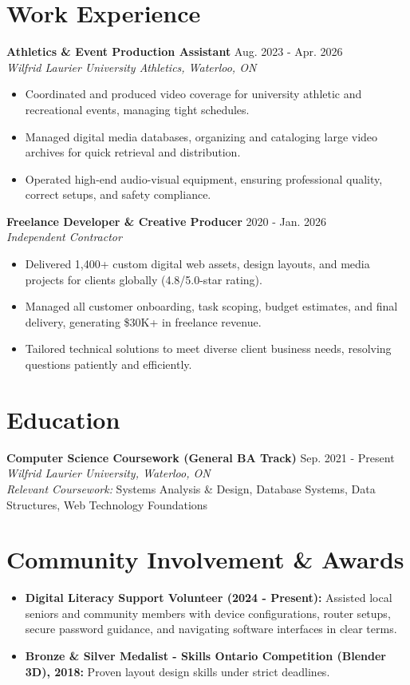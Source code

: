 \documentclass[a4paper,10pt]{article}
\begin{document}
\section*{Work Experience}
\textbf{Athletics \& Event Production Assistant} \hfill Aug. 2023 - Apr. 2026 \\
\textit{Wilfrid Laurier University Athletics, Waterloo, ON}
\begin{itemize}
    \item Coordinated and produced video coverage for university athletic and recreational events, managing tight schedules.
    \item Managed digital media databases, organizing and cataloging large video archives for quick retrieval and distribution.
    \item Operated high-end audio-visual equipment, ensuring professional quality, correct setups, and safety compliance.
\end{itemize}

\vspace{3pt}
\textbf{Freelance Developer \& Creative Producer} \hfill 2020 - Jan. 2026 \\
\textit{Independent Contractor}
\begin{itemize}
    \item Delivered 1,400+ custom digital web assets, design layouts, and media projects for clients globally (4.8/5.0-star rating).
    \item Managed all customer onboarding, task scoping, budget estimates, and final delivery, generating \$30K+ in freelance revenue.
    \item Tailored technical solutions to meet diverse client business needs, resolving questions patiently and efficiently.
\end{itemize}

\section*{Education}
\textbf{Computer Science Coursework (General BA Track)} \hfill Sep. 2021 - Present \\
\textit{Wilfrid Laurier University, Waterloo, ON} \\
\textit{Relevant Coursework:} Systems Analysis \& Design, Database Systems, Data Structures, Web Technology Foundations

\section*{Community Involvement \& Awards}
\begin{itemize}
    \item \textbf{Digital Literacy Support Volunteer (2024 - Present):} Assisted local seniors and community members with device configurations, router setups, secure password guidance, and navigating software interfaces in clear terms.
    \item \textbf{Bronze \& Silver Medalist - Skills Ontario Competition (Blender 3D), 2018:} Proven layout design skills under strict deadlines.
\end{itemize}
\end{document}
